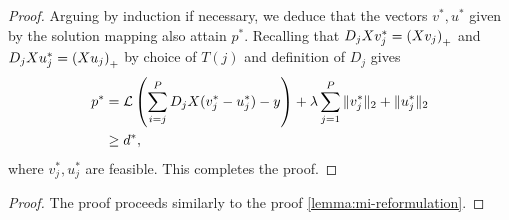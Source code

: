 \begin{proof}
    Arguing by induction if necessary, we deduce that the vectors \( v^*, u^* \) given by the solution mapping also attain \( p^* \).
    Recalling that \( D_j X v_j^* = \left(X v_j\right)_+ \) and \( D_j X u_j^* = \left(X u_j\right)_+ \) by choice of \( T(j) \) and definition of \( D_j \) gives
    \begin{align*}
        p^*
         & = \mathcal{L}\left(\sum_{i=j}^P D_j X (v^*_j - u^*_j) - y\right) + \lambda \sum_{j=1}^P \|v^*_j\|_2 + \|u^*_j\|_2 \\
         & \geq d^*,
    \end{align*}
    where \( v_j^*, u_j^* \) are feasible.
    This completes the proof.
\end{proof}

\unconstrainedEquivalence*
\begin{proof}
    The proof proceeds similarly to the proof \cref{lemma:mi-reformulation}.


\end{proof}
